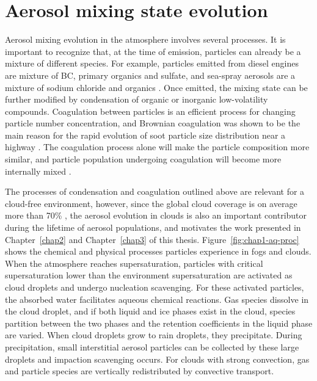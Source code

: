 \documentclass[edeposit,fullpage]{uiucthesis2009}
\begin{document}
\section{Aerosol mixing state evolution}  
Aerosol mixing evolution in the atmosphere involves several
processes. It is important to recognize that, at the time of emission,
particles can already be a mixture of different species. For example,
particles emitted from diesel engines are mixture of BC, primary
organics and sulfate, and sea-spray aerosols are a mixture of sodium
chloride and organics \citep{cheung2010emissions,
  kirpes2018secondary}. Once emitted, the mixing state can be further
modified by condensation of organic or inorganic low-volatility
compounds.
Coagulation between particles is an efficient process for changing
particle number concentration, and Brownian coagulation was shown to
be the main reason for the rapid evolution of soot particle size
distribution near a highway \citep{jacobson2004evolution}. The
coagulation process alone will make the particle composition more
similar, and particle population undergoing coagulation will become
more internally mixed \citep{Riemer2013a}.

The processes of condensation and coagulation outlined above are
relevant for a cloud-free environment, however, since the global cloud
coverage is on average more than 70\%
\citep{stubenrauch2013assessment}, the aerosol evolution in clouds is
also an important contributor during the lifetime of aerosol
populations, and motivates the work presented in Chapter~\ref{chap2}
and Chapter~\ref{chap3} of this thesis. Figure~\ref{fig:chap1-aq-proc}
shows the chemical and physical processes particles experience in fogs
and clouds. When the atmosphere reaches supersaturation, particles
with critical supersaturation lower than the environment
supersaturation are activated as cloud droplets and undergo nucleation
scavenging. For these activated particles, the absorbed water
facilitates aqueous chemical reactions. Gas species dissolve in the
cloud droplet, and if both liquid and ice phases exist in the cloud,
species partition between the two phases and the retention
coefficients in the liquid phase are varied. When cloud droplets grow
to rain droplets, they precipitate. During precipitation, small
interstitial aerosol particles can be collected by these large
droplets and impaction scavenging occurs. For clouds with strong
convection, gas and particle species are vertically redistributed by
convective transport.
\end{document}
